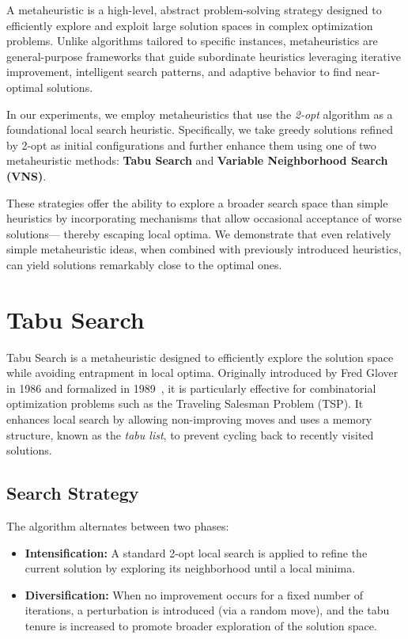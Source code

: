 A metaheuristic is a high-level, abstract problem-solving strategy designed to efficiently explore and exploit large solution spaces 
in complex optimization problems. Unlike algorithms tailored to specific instances, metaheuristics are general-purpose frameworks 
that guide subordinate heuristics leveraging iterative improvement, intelligent search patterns, and adaptive behavior to find near-optimal solutions.

In our experiments, we employ metaheuristics that use the \textit{2-opt} algorithm as a foundational local search heuristic. 
Specifically, we take greedy solutions refined by 2-opt as initial configurations and further enhance them using one of two metaheuristic methods: 
\textbf{Tabu Search} and \textbf{Variable Neighborhood Search (VNS)}.

These strategies offer the ability to explore a broader search space than simple heuristics by incorporating mechanisms that allow 
occasional acceptance of worse solutions— thereby escaping local optima. We demonstrate that even relatively simple metaheuristic ideas, 
when combined with previously introduced heuristics, can yield solutions remarkably close to the optimal ones.

\section{Tabu Search}
\label{sec:tabu}
Tabu Search is a metaheuristic designed to efficiently explore the solution space while avoiding entrapment in local optima. Originally introduced by Fred Glover in 1986 and formalized in 1989~\cite{Glover:TabuSearch}, it is particularly effective for combinatorial optimization problems such as the Traveling Salesman Problem (TSP). It enhances local search by allowing non-improving moves and uses a memory structure, known as the \textit{tabu list}, to prevent cycling back to recently visited solutions.

\subsection{Search Strategy}

The algorithm alternates between two phases:

\begin{itemize}
    \item \textbf{Intensification:} A standard 2-opt local search is applied to refine the current solution by exploring its neighborhood until a local minima.
    \item \textbf{Diversification:} When no improvement occurs for a fixed number of iterations, a perturbation is introduced (via a random move), and the tabu tenure is increased to promote broader exploration of the solution space.
\end{itemize}


